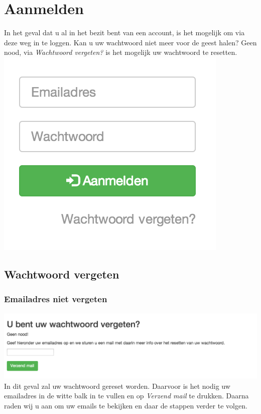 \documentclass[11pt,a4paper,oneside]{article}
\begin{document}
\section{Aanmelden}
In het geval dat u al in het bezit bent van een account, is het mogelijk om via deze weg in te loggen. 
Kan u uw wachtwoord niet meer voor de geest halen? Geen nood, via \textit{Wachtwoord vergeten?} is het mogelijk uw wachtwoord te resetten.\\
\includegraphics[scale=0.75]{img/login}

\subsection{Wachtwoord vergeten}
\subsubsection{Emailadres niet vergeten}
\includegraphics[scale=0.5]{img/emailnietvergeten} \\
In dit geval zal uw wachtwoord gereset worden. Daarvoor is het nodig uw emailadres in de witte balk in te vullen en op \textit{Verzend mail} te drukken. Daarna raden wij u aan om uw emails te bekijken en daar  de stappen verder te volgen.
\end{document}

